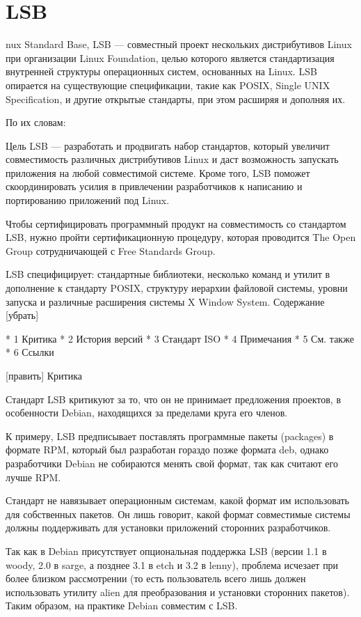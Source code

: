 \section{LSB}
nux Standard Base, LSB — совместный проект нескольких дистрибутивов Linux при организации Linux Foundation, целью которого является стандартизация внутренней структуры операционных систем, основанных на Linux. LSB опирается на существующие спецификации, такие как POSIX, Single UNIX Specification, и другие открытые стандарты, при этом расширяя и дополняя их.

По их словам:

    Цель LSB — разработать и продвигать набор стандартов, который увеличит совместимость различных дистрибутивов Linux и даст возможность запускать приложения на любой совместимой системе. Кроме того, LSB поможет скоординировать усилия в привлечении разработчиков к написанию и портированию приложений под Linux.

Чтобы сертифицировать программный продукт на совместимость со стандартом LSB, нужно пройти сертификационную процедуру, которая проводится The Open Group сотрудничающей с Free Standards Group.

LSB специфицирует: стандартные библиотеки, несколько команд и утилит в дополнение к стандарту POSIX, структуру иерархии файловой системы, уровни запуска и различные расширения системы X Window System.
Содержание
[убрать]

    * 1 Критика
    * 2 История версий
    * 3 Стандарт ISO
    * 4 Примечания
    * 5 См. также
    * 6 Ссылки

[править] Критика

Стандарт LSB критикуют за то, что он не принимает предложения проектов, в особенности Debian, находящихся за пределами круга его членов.

К примеру, LSB предписывает поставлять программные пакеты (packages) в формате RPM, который был разработан гораздо позже формата deb, однако разработчики Debian не собираются менять свой формат, так как считают его лучше RPM.

Стандарт не навязывает операционным системам, какой формат им использовать для собственных пакетов. Он лишь говорит, какой формат совместимые системы должны поддерживать для установки приложений сторонних разработчиков.

Так как в Debian присутствует опциональная поддержка LSB (версии 1.1 в woody, 2.0 в sarge, а позднее 3.1 в etch и 3.2 в lenny), проблема исчезает при более близком рассмотрении (то есть пользователь всего лишь должен использовать утилиту alien для преобразования и установки сторонних пакетов). Таким образом, на практике Debian совместим с LSB.

